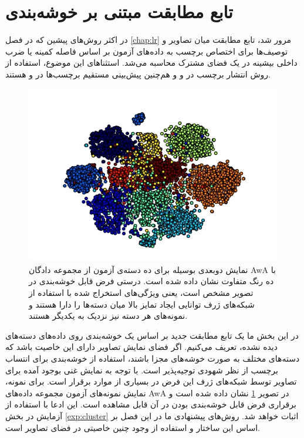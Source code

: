 \section{ تابع مطابقت مبتنی بر خوشه‌بندی }\label{compatibility_function}
در اکثر روش‌های پیشین که در فصل \ref{chap:lr} مرور شد، تابع مطابقت میان تصاویر و توصیف‌ها برای اختصاص برچسب به داده‌های آزمون بر اساس فاصله کمینه یا ضرب داخلی بیشینه در یک فضای مشترک محاسبه می‌شد. استثناهای این موضوع، استفاده از روش انتشار برچسب در \cite{Fu2014} و \cite{Kodirov2015} و هم‌چنین پیش‌بینی مستقیم برچسب‌ها در
\cite{li15max}
و
\cite{semi15}
هستند.

\begin{figure}[!t]
\centering
\includegraphics[width=0.85\linewidth]{images/awa_clusters}
\caption[نمایش دسته‌های آزمون مجموعه دادگان AwA ]{
نمایش دوبعدی بوسیله  برای ده دسته‌ی آزمون از مجموعه دادگان AwA با ده رنگ متفاوت نشان داده شده است. درستی فرض قابل خوشه‌بندی در تصویر مشخص است، یعنی ویژگی‌های استخراج شده با استفاده از شبکه‌های ژرف توانایی ایجاد تمایز بالا میان دسته‌ها را دارا هستند و نمونه‌های هر دسته نیز نزدیک به یکدیگر هستند.
}
\label{fig:awa_clusters}
\end{figure}

در این بخش ما یک تابع مطابقت جدید بر اساس یک خوشه‌بندی روی داده‌های دسته‌های دیده نشده، تعریف می‌کنیم. اگر فضای نمایش تصاویر دارای این خاصیت باشد که دسته‌های مختلف به صورت خوشه‌های مجزا باشند، استفاده از خوشه‌بندی برای انتساب برچسب از نظر شهودی توجیه‌پذیر است.
با توجه به نمایش غنی بوجود آمده برای تصاویر توسط شبکه‌های ژرف این فرض در بسیاری از موارد برقرار است. برای نمونه، نمایش  نمونه‌های آزمون مجموعه داده‌های AwA در تصویر
\ref{fig:awa_clusters}
نشان داده شده است و برقراری فرض قابل خوشه‌بندی بودن در آن قابل مشاهده است. این ادعا با استفاده از آزمایش در بخش
\ref{exp:cluster}
اثبات خواهد شد. روش‌های پیشنهادی ما در این فصل بر اساس این ساختار و استفاده از وجود چنین خاصیتی در فضای تصاویر است.

